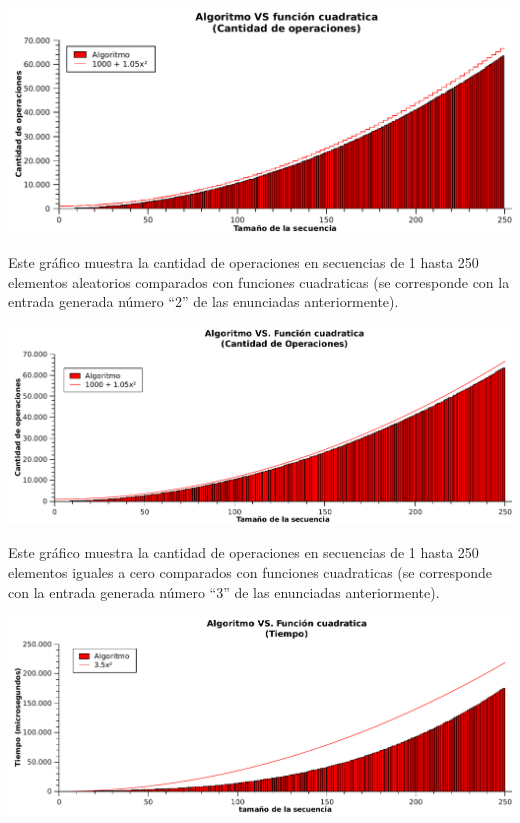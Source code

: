  \vspace*{1cm}
\hspace*{-2.1cm}\includegraphics[width=475pt]{../ej1/graficos/operaciones250.pdf}

Este gráfico muestra la cantidad de operaciones en secuencias de 1 hasta 250 elementos aleatorios comparados con funciones cuadraticas (se corresponde con la entrada generada número ``2'' de las enunciadas anteriormente).

 \vspace*{1cm}
\hspace*{-2.1cm}\includegraphics[width=475pt]{../ej1/graficos/operaciones0.pdf}

Este gráfico muestra la cantidad de operaciones en secuencias de 1 hasta 250 elementos iguales a cero comparados con funciones cuadraticas (se corresponde con la entrada generada número ``3'' de las enunciadas anteriormente).

 \vspace*{1cm}
\hspace*{-2.1cm}\includegraphics[width=475pt]{../ej1/graficos/tiempo0.pdf}

